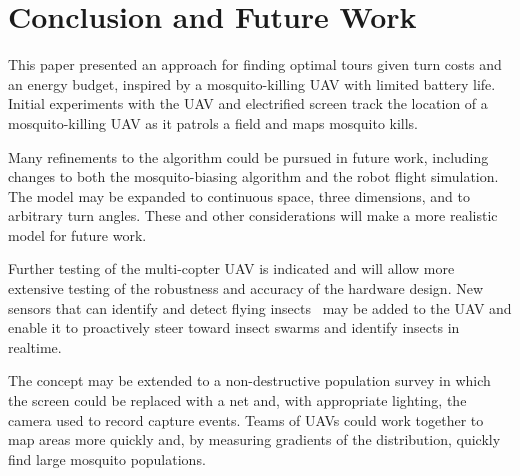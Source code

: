 \section{Conclusion and Future Work}\label{sec:conclusion}

This paper presented an approach for finding optimal tours given turn costs and an energy budget, inspired by a mosquito-killing UAV with limited battery life. 
Initial experiments with the UAV and electrified screen track the location of a mosquito-killing UAV as it patrols a field and maps mosquito kills.  

Many refinements to the algorithm could be pursued in future work, including changes to both the mosquito-biasing algorithm and the robot flight simulation.  The model may be expanded to continuous space, three dimensions, and to arbitrary turn angles.  These and other considerations will make a more realistic model for future work.  

Further testing of the multi-copter UAV is indicated and will allow more extensive testing of the robustness and accuracy of the hardware design. New sensors that can identify and detect flying insects~\cite{chen2014flying} may be added to the UAV and enable it to proactively steer toward insect swarms and identify insects in realtime.

The concept may be extended to a non-destructive population survey in which the screen could be replaced with a net and, with appropriate lighting, the camera used to record capture events.  Teams of UAVs could work together to map areas more quickly and, by measuring gradients of the distribution, quickly find large mosquito populations.

